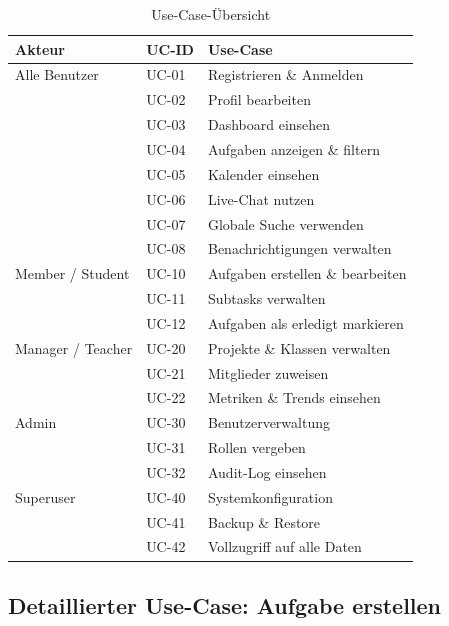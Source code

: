 \begin{table}[H]
    \centering
    \caption{Use-Case-Übersicht}
    \begin{tabularx}{\textwidth}{llX}
        \toprule
        \textbf{Akteur} & \textbf{UC-ID} & \textbf{Use-Case} \\
        \midrule
        Alle Benutzer
          & UC-01 & Registrieren \& Anmelden \\
          & UC-02 & Profil bearbeiten \\
          & UC-03 & Dashboard einsehen \\
          & UC-04 & Aufgaben anzeigen \& filtern \\
          & UC-05 & Kalender einsehen \\
          & UC-06 & Live-Chat nutzen \\
          & UC-07 & Globale Suche verwenden \\
          & UC-08 & Benachrichtigungen verwalten \\
        \midrule
        Member / Student
          & UC-10 & Aufgaben erstellen \& bearbeiten \\
          & UC-11 & Subtasks verwalten \\
          & UC-12 & Aufgaben als erledigt markieren \\
        \midrule
        Manager / Teacher
          & UC-20 & Projekte \& Klassen verwalten \\
          & UC-21 & Mitglieder zuweisen \\
          & UC-22 & Metriken \& Trends einsehen \\
        \midrule
        Admin
          & UC-30 & Benutzerverwaltung \\
          & UC-31 & Rollen vergeben \\
          & UC-32 & Audit-Log einsehen \\
        \midrule
        Superuser
          & UC-40 & Systemkonfiguration \\
          & UC-41 & Backup \& Restore \\
          & UC-42 & Vollzugriff auf alle Daten \\
        \bottomrule
    \end{tabularx}
    \label{tab:usecases}
\end{table}

\subsection{Detaillierter Use-Case: Aufgabe erstellen}

